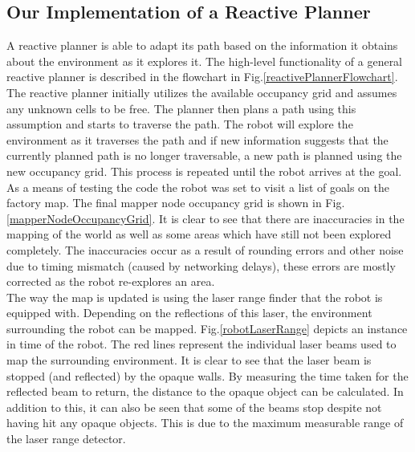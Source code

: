 \documentclass[a4paper,12pt]{article}
\begin{document}
		\subsection{Our Implementation of a Reactive Planner}

			A reactive planner is able to adapt its path based on the information it obtains about the environment as it explores it. The high-level functionality of a general reactive planner is described in the flowchart in Fig.\ref{reactivePlannerFlowchart}. The reactive planner initially utilizes the available occupancy grid and assumes any unknown cells to be free. The planner then plans a path using this assumption and starts to traverse the path. The robot will explore the environment as it traverses the path and if new information suggests that the currently planned path is no longer traversable, a new path is planned using the new occupancy grid. This process is repeated until the robot arrives at the goal.
			\\
			As a means of testing the code the robot was set to visit a list of goals on the factory map. The final mapper node occupancy grid is shown in Fig.\ref{mapperNodeOccupancyGrid}. It is clear to see that there are inaccuracies in the mapping of the world as well as some areas which have still not been explored completely. The inaccuracies occur as a result of rounding errors and other noise due to timing mismatch (caused by networking delays), these errors are mostly corrected as the robot re-explores an area.
			\\
			The way the map is updated is using the laser range finder that the robot is equipped with. Depending on the reflections of this laser, the environment surrounding the robot can be mapped. Fig.\ref{robotLaserRange} depicts an instance in time of the robot. The red lines represent the individual laser beams used to map the surrounding environment. It is clear to see that the laser beam is stopped (and reflected) by the opaque walls. By measuring the time taken for the reflected beam to return, the distance to the opaque object can be calculated. In addition to this, it can also be seen that some of the beams stop despite not having hit any opaque objects. This is due to the maximum measurable range of the laser range detector. 
\end{document}
